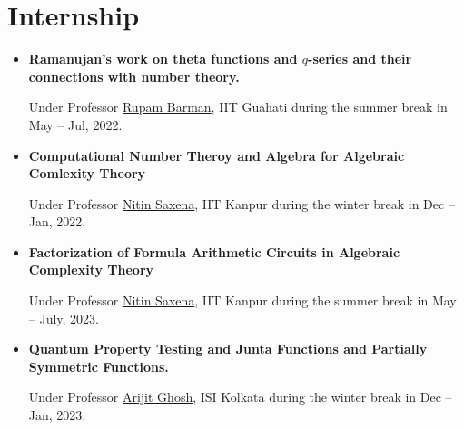 \documentclass[10pt,a4paper,sans,colorlinks]{moderncv}        %
\begin{document}
\section{Internship}
\begin{itemize}
	\item \textbf{Ramanujan's work on theta functions and $q$-series and their connections with number theory.}

	      \hfill Under Professor \href{https://www.iitg.ac.in/rupam/}{Rupam Barman}, IIT Guahati during the summer break in May -- Jul, 2022.

	\item \textbf{Computational Number Theroy and Algebra for Algebraic Comlexity Theory }

	      \hfill Under Professor \href{https://www.cse.iitk.ac.in/users/nitin/}{Nitin Saxena}, IIT Kanpur during the winter break in Dec -- Jan, 2022.
	      
	\item \textbf{Factorization of Formula Arithmetic Circuits in Algebraic Complexity Theory }
	
	\hfill Under Professor \href{https://www.cse.iitk.ac.in/users/nitin/}{Nitin Saxena}, IIT Kanpur during the summer break in May -- July, 2023.
	\item \textbf{Quantum Property Testing and Junta Functions and Partially Symmetric Functions.}
	
	\hfill Under Professor \href{https://sites.google.com/site/homepagearijitghosh/}{Arijit Ghosh}, ISI Kolkata during the winter break in Dec -- Jan, 2023.
\end{itemize}
\end{document}
